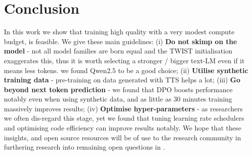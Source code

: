 \section{Conclusion}
In this work we show that training high quality \slms with a very modest compute budget, is feasible. We give these main guidelines: (i) \textbf{Do not skimp on the model} - not all model families are born equal and the TWIST initialisation exaggerates this, thus it is worth selecting a stronger / bigger text-LM even if it means less tokens. we found Qwen$2.5$ to be a good choice; (ii) \textbf{Utilise synthetic training data} - pre-training on data generated with TTS helps a lot; (iii) \textbf{Go beyond next token prediction} - we found that DPO boosts performance notably even when using synthetic data, and as little as $30$ minutes training massively improves results; (iv) \textbf{Optimise hyper-parameters} - as researchers we often dis-regard this stage, yet we found that tuning learning rate schedulers and optimising code efficiency can improve results notably. We hope that these insights, and open source resources will be of use to the research community in furthering research into remaining open questions in \slms.